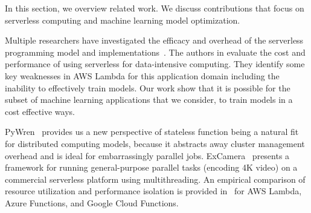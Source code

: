 In this section, we overview related work. We discuss contributions that focus
on serverless computing and machine learning model optimization. 

Multiple researchers have investigated the efficacy and overhead of the
serverless programming model and 
implementations~\cite{ref:jonas2017occupy,ref:onesteptwostep, ref:baldini2017,ref:lin2018tracking}.
The authors in \cite{ref:onesteptwostep} evaluate the cost and performance of using
serverless for data-intensive computing.  They identify some key weaknesses in AWS
Lambda for this application domain including the inability to effectively train models.
Our work show that it is possible for the subset of machine learning applications that we 
consider, to train models in a cost effective ways.

PyWren~\cite{ref:jonas2017occupy} provides us a new perspective of stateless function being a natural fit for distributed computing models, because it 
abstracts away cluster management overhead and is ideal for embarrassingly parallel jobs. 
ExCamera~\cite{ref:encoding} presents a 
framework for running general-purpose parallel tasks (encoding 4K video) 
on a commercial serverless platform using multithreading. 
An empirical comparison of resource utilization and performance isolation
is provided in~\cite{ref:peeking} for AWS Lambda, 
Azure Functions, and Google Cloud Functions.


